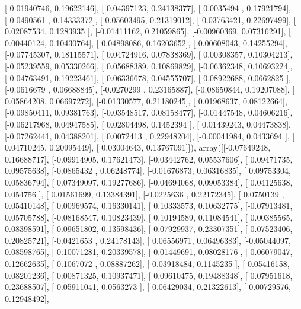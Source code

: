\documentclass{article}
\begin{document}
       [ 0.01940746,  0.19622146],
       [ 0.04397123,  0.24138377],
       [ 0.0035494 ,  0.17921794],
       [-0.0490561 ,  0.14333372],
       [ 0.05603495,  0.21319012],
       [ 0.03763421,  0.22697499],
       [ 0.02087534,  0.1283935 ],
       [-0.01411162,  0.21059865],
       [-0.00960369,  0.07316291],
       [ 0.00440124,  0.10430764],
       [ 0.04898086,  0.16203652],
       [ 0.00608043,  0.14255294],
       [-0.07745307,  0.18115571],
       [ 0.04724916,  0.07838369],
       [ 0.00308357,  0.10304213],
       [-0.05239559,  0.05330266],
       [ 0.05688389,  0.10869829],
       [-0.06362348,  0.10693224],
       [-0.04763491,  0.19223461],
       [ 0.06336678,  0.04555707],
       [ 0.08922688,  0.0662825 ],
       [-0.0616679 ,  0.06688845],
       [-0.0270299 ,  0.23165887],
       [-0.08650844,  0.19207088],
       [ 0.05864208,  0.06697272],
       [-0.01330577,  0.21180245],
       [ 0.01968637,  0.08122664],
       [-0.09850411,  0.09381763],
       [-0.03548517,  0.08158477],
       [-0.01447548,  0.04606216],
       [-0.06217968,  0.04947585],
       [ 0.02804498,  0.1452394 ],
       [ 0.01439243,  0.04473838],
       [-0.07262441,  0.04388201],
       [ 0.0072413 ,  0.22948204],
       [-0.00041984,  0.0433694 ],
       [ 0.04710245,  0.20995449],
       [ 0.03004643,  0.13767091]]), array([[-0.07649248,  0.16688717],
       [-0.09914905,  0.17621473],
       [-0.03442762,  0.05537606],
       [ 0.09471735,  0.09575638],
       [-0.0865432 ,  0.06248774],
       [-0.01676873,  0.06316835],
       [ 0.09753304,  0.05836794],
       [ 0.07349097,  0.19277686],
       [-0.04694068,  0.09053384],
       [ 0.04125638,  0.054756  ],
       [ 0.01561699,  0.13384391],
       [-0.0225636 ,  0.22172345],
       [ 0.0750139 ,  0.05410148],
       [ 0.00969574,  0.16330141],
       [ 0.10333573,  0.10632775],
       [-0.07913481,  0.05705788],
       [-0.08168547,  0.10823439],
       [ 0.10194589,  0.11084541],
       [ 0.00385565,  0.08398591],
       [ 0.09651802,  0.13598436],
       [-0.07929937,  0.23307351],
       [-0.07523406,  0.20825721],
       [-0.0421653 ,  0.24178143],
       [ 0.06556971,  0.06496383],
       [-0.05044097,  0.08598765],
       [-0.10071281,  0.20339578],
       [ 0.01449691,  0.08028176],
       [ 0.06079047,  0.12662635],
       [ 0.1067072 ,  0.08887262],
       [-0.03918484,  0.1145235 ],
       [-0.05416158,  0.08201236],
       [ 0.00871325,  0.10937471],
       [ 0.09610475,  0.19488348],
       [ 0.07951618,  0.23688507],
       [ 0.05911041,  0.0563273 ],
       [-0.06429034,  0.21322613],
       [ 0.00729576,  0.12948492],
\end{document}
